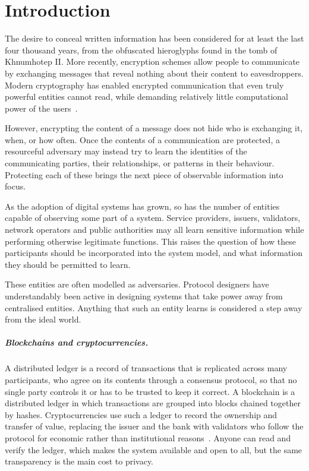 \chapter{Introduction}\label{chap:introduction}

The desire to conceal written information has been considered for at least the
last four thousand years, from the obfuscated hieroglyphs found in the tomb of
Khnumhotep II. More recently, encryption schemes allow people to communicate by
exchanging messages that reveal nothing about their content to eavesdroppers.
Modern cryptography has enabled encrypted communication that even truly
powerful entities cannot read, while demanding relatively little computational
power of the users~\cite{DifHel76}.

However, encrypting the content of a message does not hide who is exchanging
it, when, or how often. Once the contents of a communication are
protected, a resourceful adversary may instead try to learn the identities of
the communicating parties, their relationships, or patterns in their behaviour.
Protecting each of these brings the next piece of observable information into
focus.

As the adoption of digital systems has grown, so has the number of
entities capable of observing some part of a system. Service providers,
issuers, validators, network operators and public authorities may all learn
sensitive information while performing otherwise legitimate functions.  This
raises the question of how these participants should be incorporated into the
system model, and what information they should be permitted to learn.

These entities are often modelled as adversaries.  Protocol designers have
understandably been active in designing systems that take power away from
centralised entities. Anything that such an entity learns is considered a step
away from the ideal world.

\paragraph{Blockchains and cryptocurrencies.} A distributed ledger is a record of transactions that
is replicated across many participants, who agree on its contents through a
consensus protocol, so that no single party controls it or has to be trusted to
keep it correct. A blockchain is a distributed ledger in which transactions are
grouped into blocks chained together by hashes. Cryptocurrencies use such a
ledger to record the ownership and transfer of value, replacing the issuer and
the bank with validators who follow the protocol for economic rather than
institutional reasons~\cite{bitcoin,ethereum}. Anyone can read and verify the
ledger, which makes the system available and open to all, but the same
transparency is the main cost to privacy.

